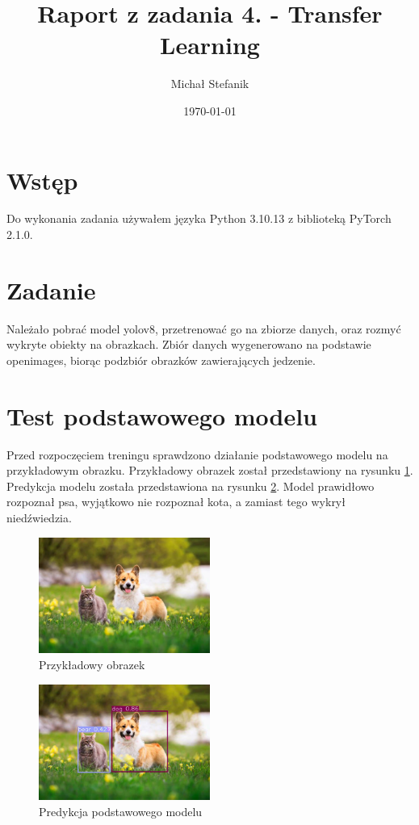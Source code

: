 \documentclass[a4paper]{article}
\author{Michał Stefanik}
\date{\today}
\title{Raport z zadania 4. - Transfer Learning}
\begin{document}
\maketitle
\section{Wstęp}
Do wykonania zadania używałem języka Python 3.10.13
z biblioteką PyTorch 2.1.0.

\section{Zadanie}

Należało pobrać model yolov8, przetrenować go na zbiorze danych, oraz rozmyć wykryte obiekty na obrazkach.
Zbiór danych wygenerowano na podstawie openimages, biorąc podzbiór obrazków zawierających jedzenie.

\section{Test podstawowego modelu}

Przed rozpoczęciem treningu sprawdzono działanie podstawowego modelu na przykładowym obrazku.
Przykładowy obrazek został przedstawiony na rysunku \ref{fig:cat_dog}.
Predykcja modelu została przedstawiona na rysunku \ref{fig:cat_dog_pred}.
Model prawidłowo rozpoznał psa, wyjątkowo nie rozpoznał kota, a zamiast tego wykrył niedźwiedzia.

\begin{figure}[H]
    \centering
    \includegraphics[width=0.5\textwidth]{cat_dog.jpg}
    \caption{Przykładowy obrazek}
    \label{fig:cat_dog}
\end{figure}

\begin{figure}[H]
    \centering
    \includegraphics[width=0.5\textwidth]{cat_dog_result.jpg}
    \caption{Predykcja podstawowego modelu}
    \label{fig:cat_dog_pred}
\end{figure}
\end{document}

